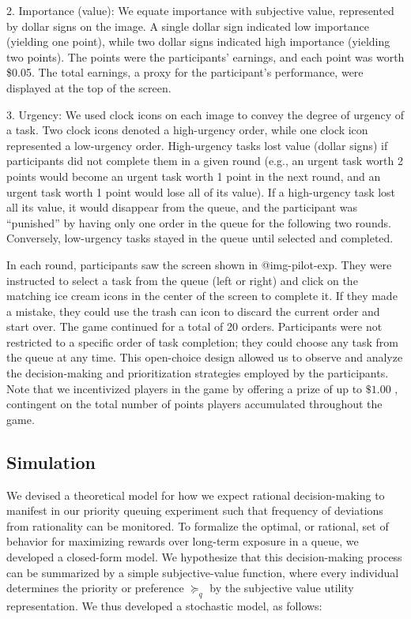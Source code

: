 \documentclass[
]{report}
\begin{document}
2. Importance (value): We equate importance with subjective value,
represented by dollar signs on the image. A single dollar sign indicated
low importance (yielding one point), while two dollar signs indicated
high importance (yielding two points). The points were the participants'
earnings, and each point was worth \$0.05. The total earnings, a proxy
for the participant's performance, were displayed at the top of the
screen.

3. Urgency: We used clock icons on each image to convey the degree of
urgency of a task. Two clock icons denoted a high-urgency order, while
one clock icon represented a low-urgency order. High-urgency tasks lost
value (dollar signs) if participants did not complete them in a given
round (e.g., an urgent task worth 2 points would become an urgent task
worth 1 point in the next round, and an urgent task worth 1 point would
lose all of its value). If a high-urgency task lost all its value, it
would disappear from the queue, and the participant was ``punished'' by
having only one order in the queue for the following two rounds.
Conversely, low-urgency tasks stayed in the queue until selected and
completed.

In each round, participants saw the screen shown in @img-pilot-exp. They
were instructed to select a task from the queue (left or right) and
click on the matching ice cream icons in the center of the screen to
complete it. If they made a mistake, they could use the trash can icon
to discard the current order and start over. The game continued for a
total of 20 orders. Participants were not restricted to a specific order
of task completion; they could choose any task from the queue at any
time. This open-choice design allowed us to observe and analyze the
decision-making and prioritization strategies employed by the
participants. Note that we incentivized players in the game by offering
a prize of up to \(\$1.00\) , contingent on the total number of points
players accumulated throughout the game.

\hypertarget{simulation-1}{%
\subsection{Simulation}\label{simulation-1}}

We devised a theoretical model for how we expect rational
decision-making to manifest in our priority queuing experiment such that
frequency of deviations from rationality can be monitored. To formalize
the optimal, or rational, set of behavior for maximizing rewards over
long-term exposure in a queue, we developed a closed-form model. We
hypothesize that this decision-making process can be summarized by a
simple subjective-value function, where every individual determines the
priority or preference \(\succeq_q\) by the subjective value utility
representation. We thus developed a stochastic model, as follows:
\end{document}
